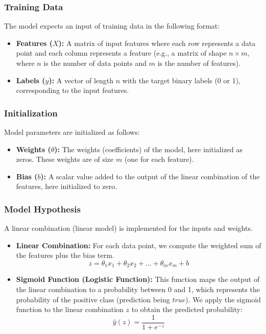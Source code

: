 \documentclass{article}
\theoremstyle{plain}
\theoremstyle{definition}
\theoremstyle{remark}
\begin{document}
\subsubsection{Training Data}

The model expects an input of training data in the following format:
\begin{itemize}

\item \textbf{Features ($X$):} A matrix of input features where each row represents a data point and each column represents a feature (e.g., a matrix of shape $n \times m$, where $n$ is the number of data points and $m$ is the number of features).

\item \textbf{Labels ($y$):} A vector of length $n$ with the target binary labels (0 or 1), corresponding to the input features.
\end{itemize}


\subsubsection{Initialization}

Model parameters are initialized as follows:

\begin{itemize}
\item \textbf{Weights ($\theta$):} The weights (coefficients) of the model, here initialized as zeros. These weights are of size $m$ (one for each feature).

\item \textbf{Bias ($b$):} A scalar value added to the output of the linear combination of the features, here initialized to zero.

\end{itemize}


\subsubsection{Model Hypothesis}

A linear combination (linear model) is implemented for the inputs and weights.

\begin{itemize}

\item \textbf{Linear Combination:} For each data point, we compute the weighted sum of the features plus the bias term.
$$
z = \theta_1 x_1 + \theta_2 x_2 + \dots + \theta_m x_m + b
$$

\item \textbf{Sigmoid Function (Logistic Function):} This function maps the output of the linear combination to a probability between 0 and 1, which represents the probability of the positive class (prediction being $true$). We apply the sigmoid function to the linear combination $z$ to obtain the predicted probability:
$$
\hat{y}(z) = \frac{1}{1 + e^{-z}}
$$

\end{itemize}
\end{document}
